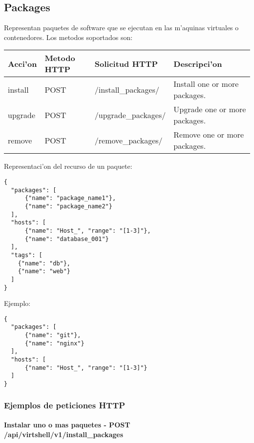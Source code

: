 \subsection{Packages}
Representan paquetes de software que se ejecutan en las m'aquinas virtuales o contenedores. Los metodos soportados son:

\begin{center}
 \begin{tabular}{| l | l | l | l |}
 \hline
  \rowcolor{blueapi}
  \textbf{Acci'on} & \textbf{Metodo HTTP} & \textbf{Solicitud HTTP} & \textbf{Descripci'on} \\ [0.5ex] 
  \hline\hline
  install & POST & /install\_packages/ & Install one or more packages. \\
  \hline
  upgrade & POST & /upgrade\_packages/ & Upgrade one or more packages. \\
  \hline
  remove & POST & /remove\_packages/ & Remove one or more packages. \\ [1ex] 
  \hline
\end{tabular}
\end{center}

\vspace{1cm}
Representaci'on del recurso de un paquete:
\vspace{1cm}

\begin{lstlisting}[style=json]
{
  "packages": [
      {"name": "package_name1"},
      {"name": "package_name2"}
  ],
  "hosts": [ 
      {"name": "Host_", "range": "[1-3]"}, 
      {"name": "database_001"}
  ],
  "tags": [
    {"name": "db"},
    {"name": "web"}
  ]
}
\end{lstlisting}

Ejemplo:

\medskip
\begin{lstlisting}[style=json]
{
  "packages": [
      {"name": "git"},
      {"name": "nginx"}
  ],
  "hosts": [ 
      {"name": "Host_", "range": "[1-3]"}
  ]
}
\end{lstlisting}

\subsubsection{Ejemplos de peticiones HTTP}

\paragraph{Instalar uno o mas paquetes - POST /api/virtshell/v1/install\_packages} ~\\


